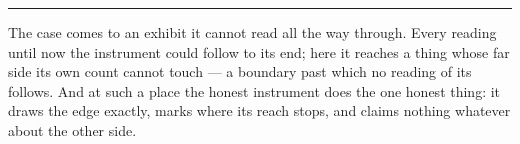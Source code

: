 %
%
%
%

\bigskip
\begin{center}
\rule{0.4\textwidth}{0.4pt}
\end{center}
\bigskip

\noindent The case comes to an exhibit it cannot read all the way through. Every reading until now the
instrument could follow to its end; here it reaches a thing whose far side its own count cannot touch --- a
boundary past which no reading of its follows. And at such a place the honest instrument does the one honest
thing: it draws the edge exactly, marks where its reach stops, and claims nothing whatever about the other side.


